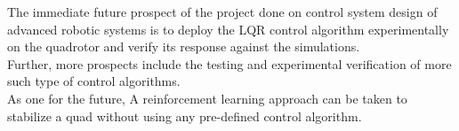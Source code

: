 The immediate future prospect of the project done on control system design of advanced robotic systems is to deploy the LQR control algorithm experimentally on the quadrotor and verify its response against the simulations. \\

Further, more prospects include the testing and experimental verification of more such type of control algorithms.\\

As one for the future, A reinforcement learning approach can be taken to stabilize a quad without using any pre-defined control algorithm.
